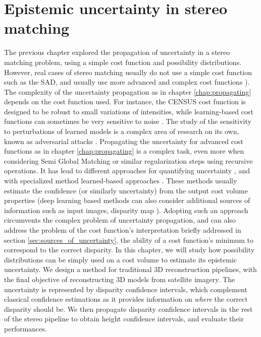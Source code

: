 \chapter{Epistemic uncertainty in stereo matching}\label{chap:epistemic_uncertainty}
The previous chapter explored the propagation of uncertainty in a stereo matching problem, using a simple cost function and possibility distributions. However, real cases of stereo matching usually do not use a simple cost function such as the SAD, and usually use more advanced and complex cost functions \cite{zabih_non-parametric_1994,zbontar_stereo_2016,laga_survey_2022}). The complexity of the uncertainty propagation as in chapter \ref{chap:propagating} depends on the cost function used. For instance, the CENSUS cost function \cite{zabih_non-parametric_1994} is designed to be robust to small variations of intensities, while learning-based cost functions can sometimes be very sensitive to noise \cite{szegedy_intriguing_2013,carlini_towards_2017}. The study of the sensitivity to perturbations of learned models is a complex area of research on its own, known as adversarial attacks \cite{chen_shapeshifter_2018, zhao_seeing_2019}. Propagating the uncertainty for advanced cost functions as in chapter \ref{chap:propagating} is a complex task, even more when considering Semi Global Matching or similar regularization steps using recursive operations. It has lead to different approaches for quantifying uncertainty \cite{hu_quantitative_2012}, and with specialized method learned-based approaches \cite{laga_survey_2022,poggi_confidence_2021,wang_uncertainty_2022}. These methods usually estimate the confidence (or similarly uncertainty) from the output cost volume properties (deep learning based methods can also consider additional sources of information such as input images, disparity map \etc). Adopting such an approach circumvents the complex problem of uncertainty propagation, and can also address the problem of the cost function's interpretation briefly addressed in section \ref{sec:sources_of_uncertainty}, \ie the ability of a cost function's minimum to correspond to the correct disparity. In this chapter, we will study how possibility distributions can be simply used on a cost volume to estimate its epistemic uncertainty. We design a method for traditional 3D reconstruction pipelines, with the final objective of reconstructing 3D models from satellite imagery. The uncertainty is represented by disparity confidence intervals, which complement classical confidence estimations as it provides information on \textit{where} the correct disparity should be. We then propagate disparity confidence intervals in the rest of the stereo pipeline to obtain height confidence intervals, and evaluate their performances.

